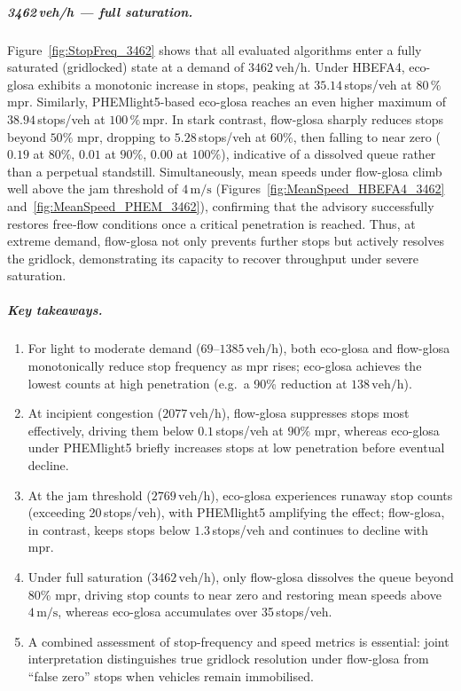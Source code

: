 \subparagraph*{3462\,veh/h --- full saturation.}
Figure~\ref{fig:StopFreq_3462} shows that all evaluated algorithms enter a fully saturated (gridlocked) state at a demand of $3462\,\mathrm{veh/h}$. Under HBEFA4, \ac{eco-glosa} exhibits a monotonic increase in stops, peaking at \textbf{$35.14$}\,stops/veh at $80\,\%$\,\ac{mpr}. Similarly, PHEMlight5-based \ac{eco-glosa} reaches an even higher maximum of \textbf{$38.94$}\,stops/veh at $100\,\%$\,\ac{mpr}. In stark contrast, \ac{flow-glosa} sharply reduces stops beyond $50\%$ \ac{mpr}, dropping to $5.28$\,stops/veh at $60\%$, then falling to near zero ($0.19$ at $80\%$, $0.01$ at $90\%$, $0.00$ at $100\%$), indicative of a dissolved queue rather than a perpetual standstill. Simultaneously, mean speeds under \ac{flow-glosa} climb well above the jam threshold of $4\,\mathrm{m/s}$ (Figures~\ref{fig:MeanSpeed_HBEFA4_3462} and~\ref{fig:MeanSpeed_PHEM_3462}), confirming that the advisory successfully restores free‐flow conditions once a critical penetration is reached. Thus, at extreme demand, \ac{flow-glosa} not only prevents further stops but actively resolves the gridlock, demonstrating its capacity to recover throughput under severe saturation.

\subparagraph*{Key takeaways.}
\begin{enumerate}[label=(\alph*)]
  \item For light to moderate demand ($69$–$1385\,\mathrm{veh/h}$), both \ac{eco-glosa} and \ac{flow-glosa} monotonically reduce stop frequency as \ac{mpr} rises; \ac{eco-glosa} achieves the lowest counts at high penetration (e.g.\ a 90\% reduction at $138\,\mathrm{veh/h}$).
  \item At incipient congestion ($2077\,\mathrm{veh/h}$), \ac{flow-glosa} suppresses stops most effectively, driving them below $0.1$\,stops/veh at $90\%$ \ac{mpr}, whereas \ac{eco-glosa} under PHEMlight5 briefly increases stops at low penetration before eventual decline.
  \item At the jam threshold ($2769\,\mathrm{veh/h}$), \ac{eco-glosa} experiences runaway stop counts (exceeding 20\,stops/veh), with PHEMlight5 amplifying the effect; \ac{flow-glosa}, in contrast, keeps stops below $1.3$\,stops/veh and continues to decline with \ac{mpr}.
  \item Under full saturation ($3462\,\mathrm{veh/h}$), only \ac{flow-glosa} dissolves the queue beyond 80\% \ac{mpr}, driving stop counts to near zero and restoring mean speeds above $4\,\mathrm{m/s}$, whereas \ac{eco-glosa} accumulates over 35\,stops/veh.
  \item A combined assessment of stop-frequency and speed metrics is essential: joint interpretation distinguishes true gridlock resolution under \ac{flow-glosa} from \enquote{false zero} stops when vehicles remain immobilised.
\end{enumerate}

